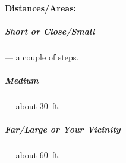 \documentclass[itdr]{subfiles}
\begin{document}
\break

\begin{dbox}
	\paragraph{Distances/Areas:}
	\subparagraph{Short or Close/Small} --- a couple of steps.
	\subparagraph{Medium} --- about 30~ft.
	\subparagraph{Far/Large or Your Vicinity} --- about 60~ft.
\end{dbox}

\vfill


\vfill
\break
\end{document}
